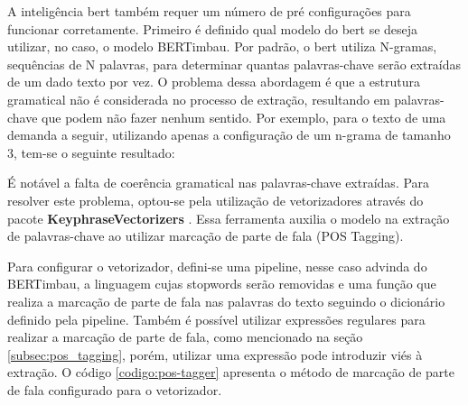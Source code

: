 A inteligência \gls{bert} também requer um número de pré configurações para funcionar corretamente. Primeiro é definido qual modelo do \gls{bert} se deseja utilizar, no caso, o modelo BERTimbau. Por padrão, o \gls{bert} utiliza N-gramas, sequências de N palavras, para determinar quantas palavras-chave serão extraídas de um dado texto por vez. O problema dessa abordagem é que a estrutura gramatical não é considerada no processo de extração, resultando em palavras-chave que podem não fazer nenhum sentido. Por exemplo, para o texto de uma demanda a seguir, utilizando apenas a configuração de um n-grama de tamanho 3, tem-se o seguinte resultado:



É notável a falta de coerência gramatical nas palavras-chave extraídas. Para resolver este problema, optou-se pela utilização de vetorizadores através do pacote \textbf{KeyphraseVectorizers} \cite{schopf_etal_kdir22}. Essa ferramenta auxilia o modelo na extração de palavras-chave ao utilizar marcação de parte de fala (POS Tagging).

Para configurar o vetorizador, defini-se uma pipeline, nesse caso advinda do BERTimbau, a linguagem cujas stopwords serão removidas e uma função que realiza a marcação de parte de fala nas palavras do texto seguindo o dicionário definido pela pipeline. Também é possível utilizar expressões regulares para realizar a marcação de parte de fala, como mencionado na seção \ref{subsec:pos_tagging}, porém, utilizar uma expressão pode introduzir viés à extração. O código \ref{codigo:pos-tagger} apresenta o método de marcação de parte de fala configurado para o vetorizador.

